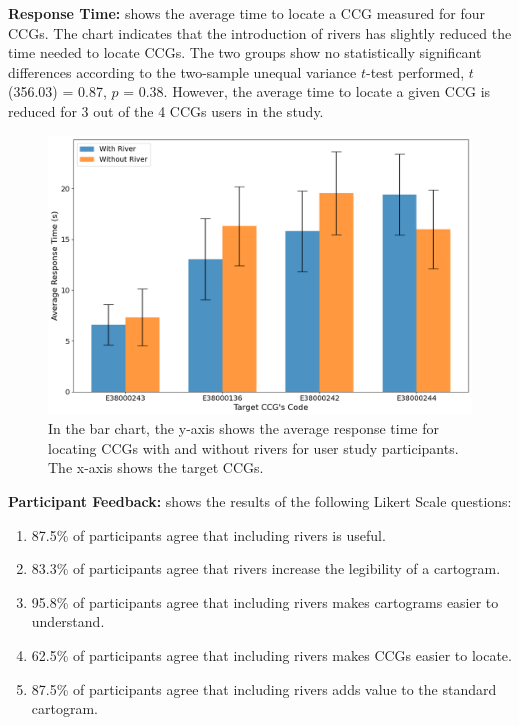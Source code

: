\documentclass[Afour,sagev,times]{sagej}
\newcommand{\bobgraph}[1]{\noindent\textbf{#1}}
\begin{document}
\bobgraph{Response Time:}  shows the average time to locate a CCG measured for four CCGs. The chart indicates that the introduction of rivers has slightly reduced the time needed to locate CCGs. The two groups show no statistically significant differences according to the two-sample unequal variance $t$-test performed, $t$(356.03) = 0.87, $p$ = 0.38. However, the average time to locate a given CCG is reduced for 3 out of the 4 CCGs users in the study.

    {
        \begin{figure}[t!]
            \centering
            \includegraphics[width=\columnwidth,keepaspectratio]{rt.png}
            \caption{In the bar chart, the y-axis shows the average response time for locating CCGs with and without rivers for user study participants. The x-axis shows the target CCGs.}
            \label{fig:task-rt}
        \end{figure}
    }

\bobgraph{Participant Feedback:}  shows the results of the following Likert Scale questions:
\begin{enumerate}[label=(\Alph*),align=left,leftmargin=*,labelindent=1em]
    \item 87.5\% of participants agree that including rivers is useful.
    \item 83.3\% of participants agree that rivers increase the legibility of a cartogram.
    \item 95.8\% of participants agree that including rivers makes cartograms easier to understand.
    \item 62.5\% of participants agree that including rivers makes CCGs easier to locate.
    \item 87.5\% of participants agree that including rivers adds value to the standard cartogram.
\end{enumerate}
\end{document}
